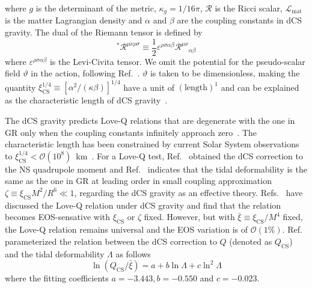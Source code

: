 \documentclass[a4paper,11pt]{article}
\newcommand{\ZW}[1]{\textcolor{magenta}{$\mathcal{ZW}$:~#1}}
\begin{document}
where $g$ is the determinant of the metric, $\kappa_g= 1/16\pi$, $\mathcal{R}$ is 
the Ricci scalar, $\mathcal{L}_{\mathrm{mat}}$ is the matter Lagrangian density 
and $\alpha$ and $\beta$ are the coupling constants in dCS gravity. The dual of the Riemann tensor is defined by 
\begin{equation}
    \label{dual riemann tensor}
    {}^{*}\mathcal{R}^{\mu\nu\rho\sigma}\equiv\frac{1}{2}\varepsilon^{\rho\sigma\alpha\beta}\mathcal{R}^{\mu\nu}{}_{\alpha\beta}
\end{equation}
where $\varepsilon^{\rho\sigma\alpha\beta}$ is the Levi-Civita tensor. We omit the 
potential for the pseudo-scalar field $\mathcal{\vartheta}$ in the action, 
following Ref.~\cite{Gupta:2017vsl}. $\mathcal{\vartheta}$ is taken to be 
dimensionless, making the quantity $\xi_{\mathrm{CS}}^{1/4} \equiv [\alpha^2/
(\kappa\beta)]^{1/4}$ have a unit of $(\text{length})^{1}$ and can be explained as 
the characteristic length of dCS gravity~\cite{Yunes:2009hc,Yagi:2012ya}. 

The dCS gravity predicts Love-Q relations that are degenerate with the one in GR 
only when the coupling constants infinitely approach zero~\cite{Yagi:2013bca,
Yagi:2013awa,Gupta:2017vsl}. The characteristic length has been constrained by 
current Solar System observations to $\xi_{\mathrm{CS}}^{1/4}<\mathcal{O}(10^8)$~km~\cite{Ali-Haimoud:2011zme,Yagi:2012ya}. 
For a Love-Q test, Ref.~\cite{Yagi:2013mbt} obtained the dCS correction to the NS 
quadrupole moment and Ref.~\cite{Yagi:2011xp} indicates that the tidal 
deformability is the same as the one in GR at leading order in small coupling 
approximation $\zeta \equiv \xi_{\mathrm{CS}} M^2/R^6 \ll 1$, regarding the dCS 
gravity as an effective theory. Refs.~\cite{Yagi_2017,Yagi:2013mbt,Gupta:2017vsl} 
have discussed the Love-Q relation under dCS gravity and find that the relation 
becomes EOS-sensative with $\xi_{\mathrm{CS}}$ or $\zeta$ fixed. However, but with 
$\bar{\xi}\equiv \xi_{\mathrm{CS}}/M^4$ fixed, the Love-Q relation remains 
universal and the EOS variation is of $\mathcal{O}(1\%)$. Ref.~\cite{Gupta:2017vsl} 
parameterized the relation between the dCS correction to $Q$ (denoted as $Q_{\mathrm{CS}}$) and the tidal deformability $\Lambda$ as follows
\begin{equation}
    \label{cs_Love_Q_eq}
    \ln (Q_{\mathrm{CS}}/\bar{\xi}) = a + b \ln \Lambda + c \ln^{2} \Lambda
\end{equation} 
where the fitting coefficients $a=-3.443, b=-0.550$ and $c=-0.023$. 
\end{document}
